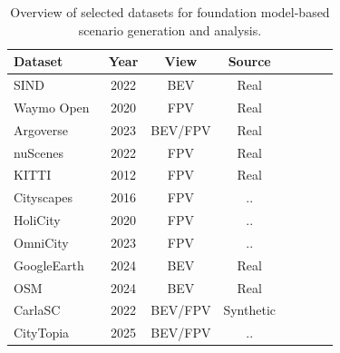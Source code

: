 \documentclass{article}
\begin{document}
\begin{table}[ht]
\centering
\caption{Overview of selected datasets for foundation model-based scenario generation and analysis.}
\label{tab:datasets}
\renewcommand{\arraystretch}{1.1}
\begin{tabular}{lccccccc}
\toprule
\textbf{Dataset} & \textbf{Year} & \textbf{View} & \textbf{Source} \\
\midrule
SIND~\cite{xu2022drone}             & 2022 & BEV        & Real         \\
Waymo Open~\cite{sun2020scalability}       & 2020 & FPV        & Real  \\
Argoverse~\cite{chang2019argoverse}\cite{wilson2023argoverse}        & 2023 & BEV/FPV    & Real \\
nuScenes~\cite{caesar2020nuscenes}      & 2022 & FPV        & Real \\
KITTI~\cite{geiger2012we}            & 2012 & FPV        & Real \\
Cityscapes~\cite{cordts2016cityscapes}      & 2016 & FPV        & .. \\
HoliCity~\cite{zhou2020holicity}          & 2020 & FPV        & .. \\
OmniCity~\cite{li2023omnicity}          & 2023 & FPV        & ..  \\
GoogleEarth~\cite{xie2024citydreamer}          & 2024 & BEV        & Real  \\
OSM~\cite{xie2024citydreamer}          & 2024 & BEV        & Real \\
CarlaSC~\cite{wilson2022motionsc}          & 2022 & BEV/FPV    & Synthetic \\
CityTopia~\cite{xie2025citydreamer4d}          & 2025 & BEV/FPV    & .. \\
\bottomrule
\end{tabular}
\end{table}
\end{document}
